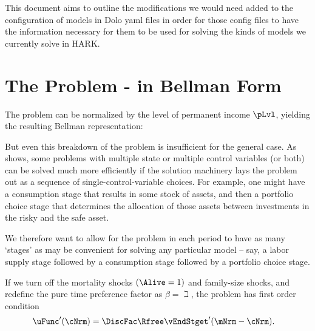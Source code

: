 \documentclass[SolvingMicroDSOPs]{subfiles}
\begin{document}

This document aims to outline the modifications we would need added to the configuration of models in Dolo yaml files in order for those config files to have the information necessary for them to be used for solving the kinds of models we currently solve in HARK.

\providecommand{\stge}{s}
\renewcommand{\stge}{s}

\providecommand{\interval}{stage}
\renewcommand{\interval}{stage}

\section{The Problem - in Bellman Form}





The problem can be normalized by the level of permanent income $\pLvl$, yielding the resulting Bellman representation:




But even this breakdown of the problem is insufficient for the general case.  As \cite{lujanEGMn} shows, some problems with multiple state or multiple control variables (or both) can be solved much more efficiently if the solution machinery lays the problem out as a sequence of single-control-variable choices.  For example, one might have a consumption stage that results in some stock of assets, and then a portfolio choice stage that determines the allocation of those assets between investments in the risky and the safe asset.

\renewcommand{\BegStget}{s^{-}}
\renewcommand{\MidStget}{s}
\renewcommand{\EndStget}{s^{+}}

We therefore want to allow for the problem in each period to have as many `stages' as may be convenient for solving any particular model -- say, a labor supply stage followed by a consumption stage followed by a portfolio choice stage.






If we turn off the mortality shocks $(\Alive=1)$ and family-size shocks, and redefine the pure time preference factor as $\beta=\beth$, the problem has first order condition
\begin{align}
   \uFunc^{\prime}(\cNrm) & = \DiscFac \Rfree \vEndStget^{\prime}(\mNrm - \cNrm).  \label{eq:FOCstep}
\end{align}
\end{document}
